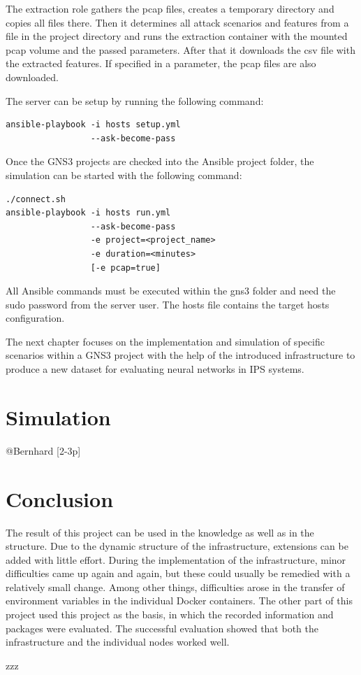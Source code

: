 \documentclass[conference]{IEEEtran}
\begin{document}
The extraction role gathers the pcap files, creates a temporary directory and copies all files there. Then it determines all attack scenarios and features from a file in the project directory and runs the extraction container with the mounted pcap volume and the passed parameters. After that it downloads the csv file with the extracted features. If specified in a parameter, the pcap files are also downloaded.

The server can be setup by running the following command:
\begin{verbatim}
ansible-playbook -i hosts setup.yml 
                 --ask-become-pass
\end{verbatim}

Once the GNS3 projects are checked into the Ansible project folder, the simulation can be started with the following command:
\begin{verbatim}
./connect.sh
ansible-playbook -i hosts run.yml
                 --ask-become-pass
                 -e project=<project_name>
                 -e duration=<minutes>
                 [-e pcap=true]
\end{verbatim}

All Ansible commands must be executed within the gns3 folder and need the sudo password from the server user. The hosts file contains the target hosts configuration.

The next chapter focuses on the implementation and simulation of specific scenarios within a GNS3 project with the help of the introduced infrastructure to produce a new dataset for evaluating neural networks in IPS systems.  

\section{Simulation}
@Bernhard [2-3p]

\section{Conclusion}
The result of this project can be used in the knowledge as well as in the structure. Due to the dynamic structure of the infrastructure, extensions can be added with little effort. During the implementation of the infrastructure, minor difficulties came up again and again, but these could usually be remedied with a relatively small change. Among other things, difficulties arose in the transfer of environment variables in the individual Docker containers. The other part of this project used this project as the basis, in which the recorded information and packages were evaluated. The successful evaluation showed that both the infrastructure and the individual nodes worked well.

\begin{thebibliography}{00}
 zzz
\end{thebibliography}
\end{document}
